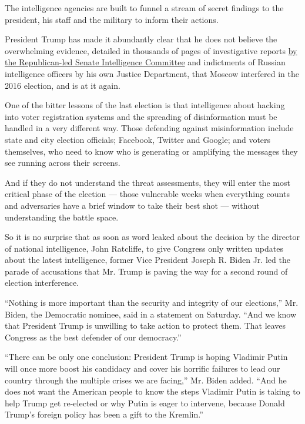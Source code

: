 The intelligence agencies are built to funnel a stream of secret
findings to the president, his staff and the military to inform their
actions.

President Trump has made it abundantly clear that he does not believe
the overwhelming evidence, detailed in thousands of pages of
investigative reports
\href{https://www.nytimes3xbfgragh.onion/2020/08/18/us/politics/senate-intelligence-russian-interference-report.html}{by
the Republican-led Senate Intelligence Committee} and indictments of
Russian intelligence officers by his own Justice Department, that Moscow
interfered in the 2016 election, and is at it again.

One of the bitter lessons of the last election is that intelligence
about hacking into voter registration systems and the spreading of
disinformation must be handled in a very different way. Those defending
against misinformation include state and city election officials;
Facebook, Twitter and Google; and voters themselves, who need to know
who is generating or amplifying the messages they see running across
their screens.

And if they do not understand the threat assessments, they will enter
the most critical phase of the election --- those vulnerable weeks when
everything counts and adversaries have a brief window to take their best
shot --- without understanding the battle space.

So it is no surprise that as soon as word leaked about the decision by
the director of national intelligence, John Ratcliffe, to give Congress
only written updates about the latest intelligence, former Vice
President Joseph R. Biden Jr. led the parade of accusations that Mr.
Trump is paving the way for a second round of election interference.

``Nothing is more important than the security and integrity of our
elections,'' Mr. Biden, the Democratic nominee, said in a statement on
Saturday. ``And we know that President Trump is unwilling to take action
to protect them. That leaves Congress as the best defender of our
democracy.''

``There can be only one conclusion: President Trump is hoping Vladimir
Putin will once more boost his candidacy and cover his horrific failures
to lead our country through the multiple crises we are facing,'' Mr.
Biden added. ``And he does not want the American people to know the
steps Vladimir Putin is taking to help Trump get re-elected or why Putin
is eager to intervene, because Donald Trump's foreign policy has been a
gift to the Kremlin.''

